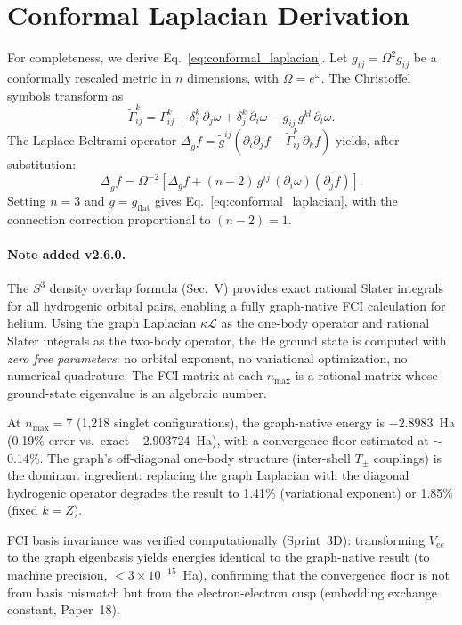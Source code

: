\documentclass[aps,pra,twocolumn,superscriptaddress,longbibliography]{revtex4-2}
\begin{document}
\section{Conformal Laplacian Derivation}
\label{app:derivation}

For completeness, we derive Eq.~\eqref{eq:conformal_laplacian}. Let $\tilde{g}_{ij} = \Omega^2 g_{ij}$ be a conformally rescaled metric in $n$ dimensions, with $\Omega = e^\omega$. The Christoffel symbols transform as
\begin{equation}
\tilde{\Gamma}^k_{ij} = \Gamma^k_{ij} + \delta^k_i\, \partial_j \omega + \delta^k_j\, \partial_i \omega - g_{ij}\, g^{kl}\, \partial_l \omega.
\end{equation}
The Laplace-Beltrami operator $\Delta_{\tilde{g}} f = \tilde{g}^{ij}\left(\partial_i \partial_j f - \tilde{\Gamma}^k_{ij}\, \partial_k f\right)$ yields, after substitution:
\begin{equation}
\Delta_{\tilde{g}} f = \Omega^{-2}\left[\Delta_g f + (n-2)\, g^{ij}\, (\partial_i \omega)(\partial_j f)\right].
\end{equation}
Setting $n = 3$ and $g = g_{\text{flat}}$ gives Eq.~\eqref{eq:conformal_laplacian}, with the connection correction proportional to $(n - 2) = 1$.

\paragraph{Note added v2.6.0.}
The $S^3$ density overlap formula (Sec.~V) provides exact rational
Slater integrals for all hydrogenic orbital pairs, enabling a fully
graph-native FCI calculation for helium.  Using the graph Laplacian
$\kappa \mathcal{L}$ as the one-body operator and rational Slater
integrals as the two-body operator, the He ground state is computed
with \emph{zero free parameters}: no orbital exponent, no variational
optimization, no numerical quadrature.  The FCI matrix at each
$n_{\max}$ is a rational matrix whose ground-state eigenvalue is an
algebraic number.

At $n_{\max} = 7$ (1,218 singlet configurations), the graph-native
energy is $-2.8983$~Ha (0.19\% error vs.\ exact $-2.903724$~Ha),
with a convergence floor estimated at $\sim$0.14\%.
The graph's off-diagonal one-body structure (inter-shell $T_\pm$
couplings) is the dominant ingredient: replacing the graph Laplacian
with the diagonal hydrogenic operator degrades the result to 1.41\%
(variational exponent) or 1.85\% (fixed $k = Z$).

FCI basis invariance was verified computationally (Sprint~3D):
transforming $V_{ee}$ to the graph eigenbasis yields energies
identical to the graph-native result (to machine precision,
$< 3 \times 10^{-15}$~Ha), confirming that the convergence floor
is not from basis mismatch but from the electron-electron cusp
(embedding exchange constant, Paper~18).
\end{document}
